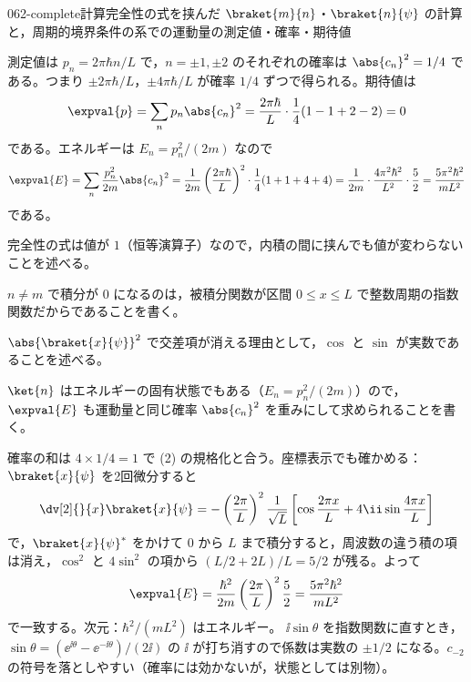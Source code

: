 \documentclass[uplatex,dvipdfmx,a4paper,11pt]{jsarticle}
\begin{document}
\begin{mondai}{062-complete}{計算}{完全性の式を挟んだ $\braket{m}{n}$・$\braket{n}{\psi}$ の計算と，周期的境界条件の系での運動量の測定値・確率・期待値}
\begin{tadashii}
 測定値は $p_{n}=2\pi\hbar n/L$ で，$n=\pm1,\pm2$ のそれぞれの確率は $\abs{c_{n}}^{2}=1/4$ である。つまり $\pm2\pi\hbar/L$，$\pm4\pi\hbar/L$ が確率 $1/4$ ずつで得られる。期待値は
\[ \expval{p}=\sum_{n}p_{n}\abs{c_{n}}^{2}=\frac{2\pi\hbar}{L}\cdot\frac{1}{4}(1-1+2-2)=0 \]
である。エネルギーは $E_{n}=p_{n}^{2}/(2m)$ なので
\[ \expval{E}=\sum_{n}\frac{p_{n}^{2}}{2m}\abs{c_{n}}^{2}=\frac{1}{2m}\left(\frac{2\pi\hbar}{L}\right)^{2}\cdot\frac{1}{4}(1+1+4+4)=\frac{1}{2m}\cdot\frac{4\pi^{2}\hbar^{2}}{L^{2}}\cdot\frac{5}{2}=\frac{5\pi^{2}\hbar^{2}}{mL^{2}} \]
である。
\begin{ronten}
  \item {} 完全性の式は値が $1$（恒等演算子）なので，内積の間に挟んでも値が変わらないことを述べる。
  \item {} $n\neq m$ で積分が $0$ になるのは，被積分関数が区間 $0\le x\le L$ で整数周期の指数関数だからであることを書く。
  \item {} $\abs{\braket{x}{\psi}}^{2}$ で交差項が消える理由として，$\cos$ と $\sin$ が実数であることを述べる。
  \item {} $\ket{n}$ はエネルギーの固有状態でもある（$E_{n}=p_{n}^{2}/(2m)$）ので，$\expval{E}$ も運動量と同じ確率 $\abs{c_{n}}^{2}$ を重みにして求められることを書く。
\end{ronten}
\kenzan 確率の和は $4\times1/4=1$ で (2) の規格化と合う。座標表示でも確かめる：$\braket{x}{\psi}$ を2回微分すると
\[ \dv[2]{}{x}\braket{x}{\psi}=-\left(\frac{2\pi}{L}\right)^{2}\frac{1}{\sqrt{L}}\left[\cos\frac{2\pi x}{L}+4\ii\sin\frac{4\pi x}{L}\right] \]
で，$\braket{x}{\psi}^{*}$ をかけて $0$ から $L$ まで積分すると，周波数の違う積の項は消え，$\cos^{2}$ と $4\sin^{2}$ の項から $(L/2+2L)/L=5/2$ が残る。よって
\[ \expval{E}=\frac{\hbar^{2}}{2m}\left(\frac{2\pi}{L}\right)^{2}\frac{5}{2}=\frac{5\pi^{2}\hbar^{2}}{mL^{2}} \]
で一致する。次元：$\hbar^{2}/(mL^{2})$ はエネルギー。
\tsumazuki $\ii\sin\theta$ を指数関数に直すとき，$\sin\theta=(\ee^{\ii\theta}-\ee^{-\ii\theta})/(2\ii)$ の $\ii$ が打ち消すので係数は実数の $\pm1/2$ になる。$c_{-2}$ の符号を落としやすい（確率には効かないが，状態としては別物）。
\end{tadashii}
\end{mondai}
\end{document}
